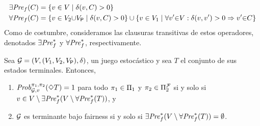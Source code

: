 %
\begin{align*}
  \exists\mathit{Pre}_f(C) = {}&\{ v \in V \mid \delta(v,C) > 0\} \\
  \forall\mathit{Pre}_f(C) = {}&\{ v \in V_2{\cup} V_{\mathsf{P}} \mid \delta(v,C)>0\} 
                       \cup \{ v \in  V_1 \mid \forall v' {\in} V : \delta(v,v') > 0 \Rightarrow v' {\in} C \}
\end{align*}
Como de costumbre, consideramos las clausuras transitivas de estos operadores, denotados $\exists\mathit{Pre}_f^*$ y $\forall\mathit{Pre}_f^*$, respectivamente.
%
\begin{theorem}\label{thm:stopping-algorithm}
  Sea $\mathcal{G} = (V, (V_1, V_2, V_{\mathsf{P}}), \delta)$, un juego estocástico y sea $T$ el conjunto de sus estados terminales. Entonces,
  \begin{enumerate}[(1)]
  \item%
    $\mathit{Prob}^{\pi_{1}, \pi_{2}}_{\mathcal{G},v}(\Diamond T) = 1$ para todo
    $\pi_{1} \in \Pi_{1}$ y $\pi_{2} \in \Pi^{\mathcal{F}}_{2}$
    si y solo si $v \in V\setminus \exists\mathit{Pre}_f^*(V \setminus \forall\mathit{Pre}_f^*(T))$, y
  \item%
    $\mathcal{G}$ es terminante bajo fairness si y solo si
    $\exists\mathit{Pre}_f^*(V \setminus \forall\mathit{Pre}_f^*(T)) = \emptyset$.
  \end{enumerate}
\end{theorem}

